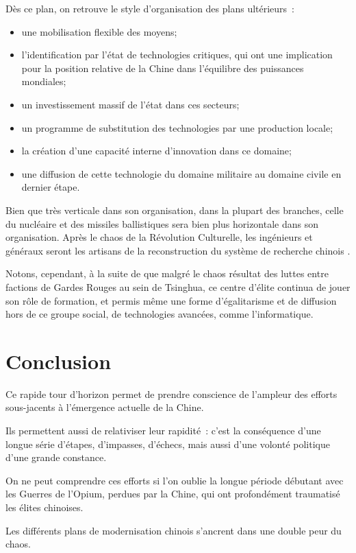 \documentclass[a4paper]{article}
\begin{document}
Dès ce plan, on retrouve le style d’organisation des plans ultérieurs~:
\begin{itemize}
\item une mobilisation flexible des moyens;
\item l’identification par l’état de technologies critiques, qui ont une implication pour la position relative de la Chine dans l’équilibre des puissances mondiales;
\item un investissement massif de l’état dans ces secteurs;
\item un programme de substitution des technologies par une production locale;
\item la création d’une capacité interne d’innovation dans ce domaine;
\item une diffusion de cette technologie du domaine militaire au domaine civile en dernier étape.
\end{itemize}

Bien que très verticale dans son organisation, dans la plupart des branches, celle du nucléaire et des missiles ballistiques sera bien plus horizontale dans son organisation. Après le chaos de la Révolution Culturelle, les ingénieurs et généraux seront les artisans de la reconstruction du système de recherche chinois \cite{feigenbaum03_chinas}.

Notons, cependant, à la suite de \cite{andreas09_rise} que malgré le chaos résultat des luttes entre factions de Gardes Rouges au sein de Tsinghua, ce centre d’élite continua de jouer son rôle de formation, et permis même une forme d’égalitarisme et de diffusion hors de ce groupe social, de technologies avancées, comme l’in\-for\-ma\-ti\-que.

\section{Conclusion}
\label{sec:org522d513}
Ce rapide tour d’horizon permet de prendre conscience de l’ampleur des efforts sous-jacents à l’émergence actuelle de la Chine.

Ils permettent aussi de relativiser leur rapidité~: c’est la conséquence d’une longue série d’étapes, d’impasses, d’échecs, mais aussi d’une volonté politique d’une grande constance.

On ne peut comprendre ces efforts si l’on oublie la longue période débutant avec les Guerres de l’Opium, perdues par la Chine, qui ont profondément traumatisé les élites chinoises.

Les différents plans de modernisation chinois s’ancrent dans une double peur du chaos.
\end{document}
